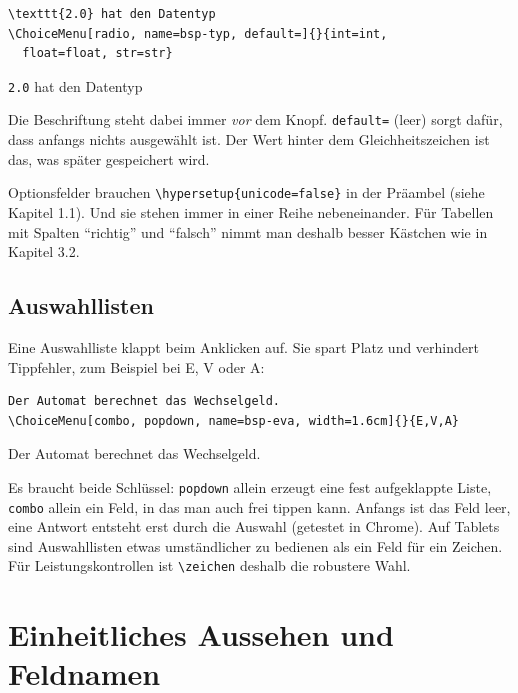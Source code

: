 \begin{Form}
\begin{lstlisting}[style=latex]
\texttt{2.0} hat den Datentyp
\ChoiceMenu[radio, name=bsp-typ, default=]{}{int=int,
  float=float, str=str}
\end{lstlisting}

\begin{ausgabe}
\texttt{2.0} hat den Datentyp
\end{ausgabe}


Die Beschriftung steht dabei immer \emph{vor} dem Knopf. \texttt{default=}
(leer) sorgt dafür, dass anfangs nichts ausgewählt ist. Der Wert hinter dem
Gleichheitszeichen ist das, was später gespeichert wird.

Optionsfelder brauchen \verb|\hypersetup{unicode=false}| in der Präambel
(siehe Kapitel 1.1). Und sie stehen immer in einer Reihe nebeneinander. Für
Tabellen mit Spalten \enquote{richtig} und \enquote{falsch} nimmt man deshalb
besser Kästchen wie in Kapitel 3.2.

\subsection{Auswahllisten}

Eine Auswahlliste klappt beim Anklicken auf. Sie spart Platz und verhindert
Tippfehler, zum Beispiel bei E, V oder A:

\begin{lstlisting}[style=latex]
Der Automat berechnet das Wechselgeld.
\ChoiceMenu[combo, popdown, name=bsp-eva, width=1.6cm]{}{E,V,A}
\end{lstlisting}

\begin{ausgabe}
Der Automat berechnet das Wechselgeld.
\end{ausgabe}


Es braucht beide Schlüssel: \texttt{popdown} allein erzeugt eine fest
aufgeklappte Liste, \texttt{combo} allein ein Feld, in das man auch frei
tippen kann. Anfangs ist das Feld leer, eine Antwort entsteht erst durch die Auswahl
(getestet in Chrome). Auf Tablets sind Auswahllisten etwas umständlicher zu
bedienen als ein Feld für ein Zeichen. Für Leistungskontrollen ist
\verb|\zeichen| deshalb die robustere Wahl.



\section{Einheitliches Aussehen und Feldnamen}


\end{Form}
